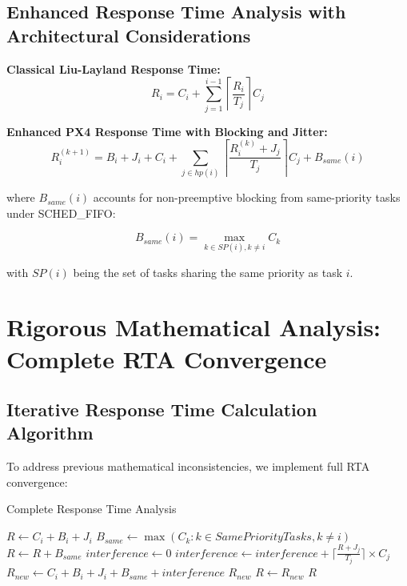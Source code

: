 \documentclass[12pt,a4paper]{article}
\begin{document}
\subsection{Enhanced Response Time Analysis with Architectural Considerations}

\textbf{Classical Liu-Layland Response Time:}
\begin{equation}
R_i = C_i + \sum_{j=1}^{i-1} \left\lceil \frac{R_i}{T_j} \right\rceil C_j
\end{equation}

\textbf{Enhanced PX4 Response Time with Blocking and Jitter:}
\begin{equation}
R_i^{(k+1)} = B_i + J_i + C_i + \sum_{j \in hp(i)} \left\lceil \frac{R_i^{(k)} + J_j}{T_j} \right\rceil C_j + B_{same}(i)
\end{equation}

where $B_{same}(i)$ accounts for non-preemptive blocking from same-priority tasks under SCHED\_FIFO:

\begin{equation}
B_{same}(i) = \max_{k \in SP(i), k \neq i} C_k
\end{equation}

with $SP(i)$ being the set of tasks sharing the same priority as task $i$.

\section{Rigorous Mathematical Analysis: Complete RTA Convergence}

\subsection{Iterative Response Time Calculation Algorithm}

To address previous mathematical inconsistencies, we implement full RTA convergence:

\begin{algorithm}[H]
\caption{Complete Response Time Analysis}
\begin{algorithmic}[1]
    \State $R \gets C_i + B_i + J_i$
    \State $B_{same} \gets \max(C_k : k \in SamePriorityTasks, k \neq i)$
    \State $R \gets R + B_{same}$
        \State $interference \gets 0$
            \State $interference \gets interference + \lceil \frac{R + J_j}{T_j} \rceil \times C_j$
        \EndFor
        \State $R_{new} \gets C_i + B_i + J_i + B_{same} + interference$
            \State \Return $R_{new}$
        \EndIf
        \State $R \gets R_{new}$
    \EndFor
    \State \Return $R$ 
\EndFunction
\end{algorithmic}
\end{algorithm}
\end{document}
